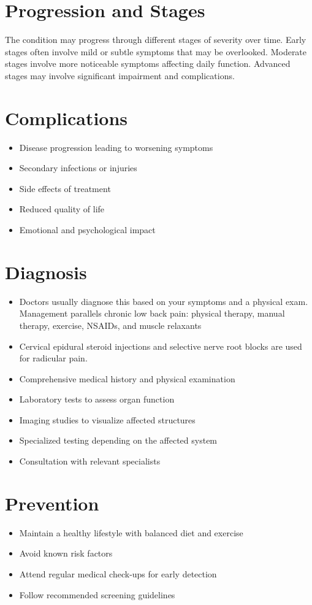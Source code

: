 \section{Progression and Stages}
The condition may progress through different stages of severity over time. Early stages often involve mild or subtle symptoms that may be overlooked. Moderate stages involve more noticeable symptoms affecting daily function. Advanced stages may involve significant impairment and complications.
\section{Complications}
\begin{itemize}[noitemsep]
  \item Disease progression leading to worsening symptoms
  \item Secondary infections or injuries
  \item Side effects of treatment
  \item Reduced quality of life
  \item Emotional and psychological impact
\end{itemize}
\section{Diagnosis}
\begin{itemize}[noitemsep]
  \item Doctors usually diagnose this based on your symptoms and a physical exam. Management parallels chronic low back pain: physical therapy, manual therapy, exercise, NSAIDs, and muscle relaxants
  \item Cervical epidural steroid injections and selective nerve root blocks are used for radicular pain.
  \item Comprehensive medical history and physical examination
  \item Laboratory tests to assess organ function
  \item Imaging studies to visualize affected structures
  \item Specialized testing depending on the affected system
  \item Consultation with relevant specialists
\end{itemize}
\section{Prevention}
\begin{itemize}[noitemsep]
  \item Maintain a healthy lifestyle with balanced diet and exercise
  \item Avoid known risk factors
  \item Attend regular medical check-ups for early detection
  \item Follow recommended screening guidelines
\end{itemize}
